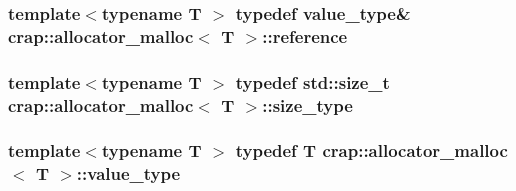 \hypertarget{classcrap_1_1allocator__malloc_a8b7fbb7f3ec9ce7edac2c9e544739a98}{
\subsubsection[{reference}]{\setlength{\rightskip}{0pt plus 5cm}template$<$typename T $>$ typedef {\bf value\-\_\-type}\& {\bf crap\-::allocator\-\_\-malloc}$<$ T $>$\-::{\bf reference}}}\label{classcrap_1_1allocator__malloc_a8b7fbb7f3ec9ce7edac2c9e544739a98}
\hypertarget{classcrap_1_1allocator__malloc_ad32425bf529526a4335179cc55a79a83}{
\subsubsection[{size\-\_\-type}]{\setlength{\rightskip}{0pt plus 5cm}template$<$typename T $>$ typedef std\-::size\-\_\-t {\bf crap\-::allocator\-\_\-malloc}$<$ T $>$\-::{\bf size\-\_\-type}}}\label{classcrap_1_1allocator__malloc_ad32425bf529526a4335179cc55a79a83}
\hypertarget{classcrap_1_1allocator__malloc_a2249a8433a4a8e146ea68bd1177ba758}{
\subsubsection[{value\-\_\-type}]{\setlength{\rightskip}{0pt plus 5cm}template$<$typename T $>$ typedef T {\bf crap\-::allocator\-\_\-malloc}$<$ T $>$\-::{\bf value\-\_\-type}}}\label{classcrap_1_1allocator__malloc_a2249a8433a4a8e146ea68bd1177ba758}


